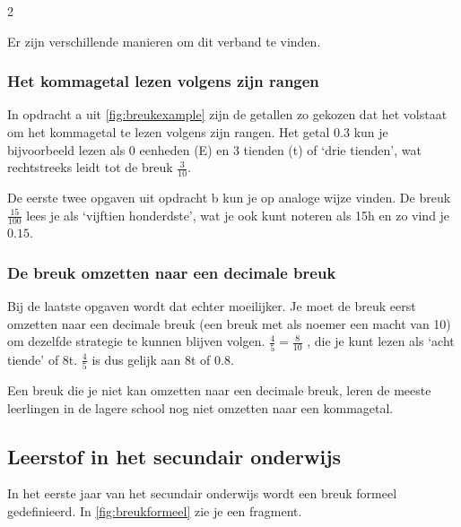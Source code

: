 \begin{multicols}{2}
    
Er zijn verschillende manieren om dit verband te vinden.

\subsubsection*{Het kommagetal lezen volgens zijn rangen}\label{het-kommagetal-lezen-volgens-zijn-rangen}

In opdracht a uit \autoref{fig:breukexample} zijn de getallen zo gekozen dat het volstaat om het kommagetal te lezen volgens zijn rangen.
Het getal \(\num{0.3}\) kun je bijvoorbeeld lezen als 0 eenheden (E) en 3 tienden (t) of `drie tienden', wat rechtstreeks leidt tot de breuk \(\frac{3}{10}\).

De eerste twee opgaven uit opdracht b kun je op analoge wijze vinden.
De breuk \(\frac{15}{100}\) lees je als `vijftien honderdste', wat je ook kunt noteren als 15h en zo vind je \(\num{0.15}\).

\subsubsection*{De breuk omzetten naar een decimale breuk}

Bij de laatste opgaven wordt dat echter moeilijker.
Je moet de breuk eerst omzetten naar een decimale breuk (een breuk met als noemer een macht van 10) om dezelfde strategie te kunnen blijven volgen.
\(\frac{4}{5} = \frac{8}{10}\) , die je kunt lezen als `acht tiende' of 8t.
\(\frac{4}{5}\) is dus gelijk aan 8t of \(\num{0.8}\).

Een breuk die je niet kan omzetten naar een decimale breuk, leren de meeste leerlingen in de lagere school nog niet omzetten naar een kommagetal.

\subsection{Leerstof in het secundair onderwijs}

In het eerste jaar van het secundair onderwijs wordt een breuk formeel gedefinieerd.
In \autoref{fig:breukformeel} zie je een fragment.

\end{multicols}
